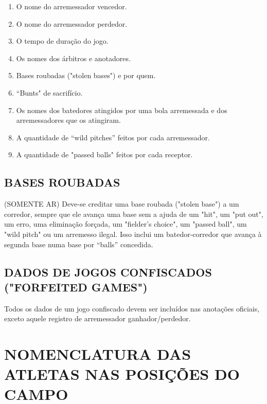 \begin{multicols}{2}
\begin{enumerate}[label=\alph*)]
		\item  O nome do arremessador vencedor. 
		
		\item  O nome do arremessador perdedor. 
		
		\item  O tempo de duração do jogo. 
		
		\item  Os nomes dos árbitros e anotadores. 
		
		\item  Bases roubadas ("stolen bases") e por quem. 
		
		\item  “Bunts" de sacrifício. 
		
		\item  Os nomes dos batedores atingidos por uma bola arremessada e dos arremessadores 
		que os atingiram. 
		
		\item  A quantidade de “wild pitches” feitos por cada arremessador. 
		
		\item  A quantidade de "passed balls" feitos por cada receptor. 
	\end{enumerate}
\end{multicols}
\section{BASES ROUBADAS} 
\begin{multicols}{2} 
	(SOMENTE AR) Deve-se creditar uma base roubada ("stolen base") a um corredor, 
	sempre que ele avança uma base sem a ajuda de um "hit", um "put out", um erro, uma 
	eliminação forçada, um "fielder's choice", um "passed ball", um "wild pitch" ou um 
	arremesso ilegal. Isso inclui um batedor-corredor que avança à segunda base numa 
	base por “balls” concedida. 
\end{multicols}

\section{DADOS DE JOGOS CONFISCADOS ("FORFEITED GAMES")} 
\begin{multicols}{2} 
	Todos os dados de um jogo confiscado devem ser incluídos nas anotações oficiais, 
	exceto aquele registro de arremessador ganhador/perdedor. 
\end{multicols}


\chapter{NOMENCLATURA DAS ATLETAS NAS POSIÇÕES DO CAMPO}

